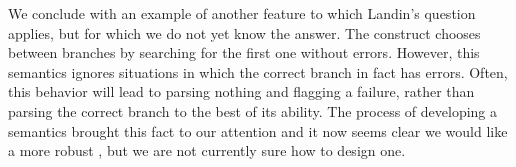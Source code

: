 We conclude with an example of another feature to which Landin's
question applies, but for which we do not yet know the answer. The \Punion{}
construct chooses between branches by searching for the first one
without errors. However, this semantics ignores situations in which
the correct branch in fact has errors. Often, this behavior will lead
to parsing nothing and flagging a failure, rather than parsing the
correct branch to the best of its ability.  The process of
developing a semantics brought this fact to our attention and
it now seems clear we would like a more robust
\Punion, but we are not currently sure how to design one. 

